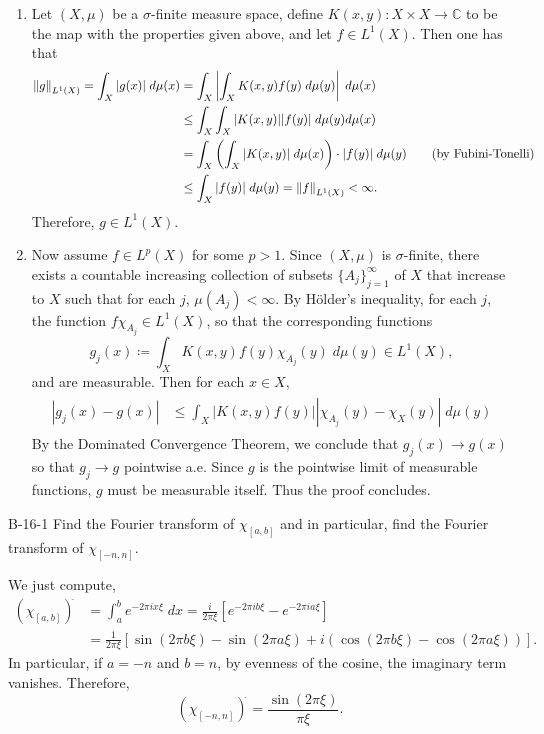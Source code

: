 \documentclass{article}
\begin{document}
	\begin{enumerate}[itemsep =-2pt,label = (\alph{*})]
		\item Let $(X, \mu)$ be a $\sigma$-finite measure space, define $K(x,y): X \times X \to \mathbb{C}$ to be the map with the properties given above, and let $f \in L^1(X)$. Then one has that 
		\begin{align*}
			\begin{split}
				\left\Vert g \right\Vert_{L^1(X)} = \int_{X}|g(x)|\;d\mu(x) &= \int_{X}\left| \int_{X}K(x,y)f(y)\;d\mu(y) \right|\;d\mu(x) \\
				&\leq \int_{X}\int_{X}|K(x,y)||f(y)|\;d\mu(y)d\mu(x) \\
				&= \int_{X}\left(\int_{X}|K(x,y)|\;d\mu(x)\right)\cdot |f(y)|\;d\mu(y) \qquad (\text{by Fubini-Tonelli}) \\
				&\leq \int_{X}|f(y)|\;d\mu(y) = \left\Vert f \right\Vert_{L^1(X)} < \infty. 
			\end{split} 
		\end{align*}
		Therefore, $g \in L^{1}(X)$. 
		\item Now assume $f \in L^p(X)$ for some $p > 1$. Since $(X, \mu)$ is $\sigma$-finite, there exists a countable increasing collection of subsets $\{A_{j}\}_{j = 1}^{\infty}$ of $X$ that increase to $X$ such that for each $j$, $\mu(A_{j}) < \infty$. By H\"older's inequality, for each $j$, the function $f\chi_{A_{j}} \in L^{1}(X)$, so that the corresponding functions 
		\begin{equation*}
			g_{j}(x) \coloneqq \int_{X}K(x,y)f(y)\chi_{A_{j}}(y)\;d\mu(y) \in L^{1}(X), 
		\end{equation*}
		and are measurable. Then for each $x \in X$, 
		\begin{align*}
			\begin{split}
				|g_{j}(x) - g(x)| &\leq \int_{X}|K(x,y)f(y)||\chi_{A_{j}}(y) - \chi_{X}(y)|\;d\mu(y)
			\end{split}
		\end{align*}
		By the Dominated Convergence Theorem, we conclude that $g_{j}(x) \to g(x)$ so that $g_{j} \to g$ pointwise a.e. Since $g$ is the pointwise limit of measurable functions, $g$ must be measurable itself. Thus the proof concludes. 
	\end{enumerate}
	
	\begin{prb}{B-16-1}
		Find the Fourier transform of $\chi_{[a,b]}$ and in particular, find the Fourier transform of $\chi_{[-n,n]}$. 
	\end{prb}
	We just compute, 
	\begin{align*}
		(\chi_{[a,b]})^{\hat{}} &= \int_{a}^{b}e^{-2\pi i x \xi}\;dx = \frac{i}{2\pi \xi}\left[e^{-2\pi i b\xi} - e^{-2\pi i a \xi}\right] \\
		&= \frac{1}{2\pi \xi}\left[\sin(2\pi b\xi) - \sin(2\pi a\xi) + i\left(\cos(2\pi b\xi) - \cos(2\pi a \xi)\right)\right]. 
	\end{align*}
	In particular, if $a = -n$ and $b = n$, by evenness of the cosine, the imaginary term vanishes. Therefore, 
	\begin{equation*}
		(\chi_{[-n,n]})^{\hat{}} = \frac{\sin(2\pi \xi)}{\pi \xi}. 
	\end{equation*}
	
\end{document}
